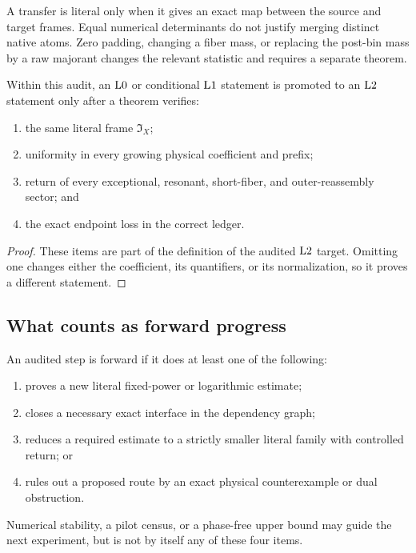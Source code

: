 A transfer is literal only when it gives an exact map between the
source and target frames.  Equal numerical determinants do not
justify merging distinct native atoms.  Zero padding, changing a
fiber mass, or replacing the post-bin mass by a raw majorant changes
the relevant statistic and requires a separate theorem.

\begin{proposition}
\label{prop:promotion-rule}
Within this audit, an \(\mathrm{L0}\) or conditional \(\mathrm{L1}\) statement is
promoted to an \(\mathrm{L2}\) statement only after a theorem verifies:
\begin{enumerate}[label=(\alph*),leftmargin=2.2em]
\item the same literal frame \(\mathfrak I_X\);
\item uniformity in every growing physical coefficient and prefix;
\item return of every exceptional, resonant, short-fiber, and
  outer-reassembly sector; and
\item the exact endpoint loss in the correct ledger.
\end{enumerate}
\end{proposition}

\begin{proof}
These items are part of the definition of the audited \(\mathrm{L2}\)
target.  Omitting one changes either the coefficient, its
quantifiers, or its normalization, so it proves a different
statement.
\end{proof}

\subsection{What counts as forward progress}

An audited step is forward if it does at least one of the following:
\begin{enumerate}[label=(\roman*),leftmargin=2.2em]
\item proves a new literal fixed-power or logarithmic estimate;
\item closes a necessary exact interface in the dependency graph;
\item reduces a required estimate to a strictly smaller literal
  family with controlled return; or
\item rules out a proposed route by an exact physical counterexample
  or dual obstruction.
\end{enumerate}
Numerical stability, a pilot census, or a phase-free upper bound may
guide the next experiment, but is not by itself any of these four
items.
